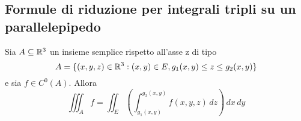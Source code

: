 \subsection{Formule di riduzione per integrali tripli su un parallelepipedo}
\begin{theorem}
  Sia $A\subseteq \mathbb{R}^3$ un insieme semplice rispetto all'asse z di tipo 
  $$A=\{(x,y,z)\in\mathbb{R}^3: (x,y)\in E, g_1(x,y)\leq z \leq g_2(x,y)\}$$
  e sia $f\in C^0(A)$. Allora 
  $$\iiint_{A}f = \iint_{E} \left(\int_{g_1(x,y)}^{g_2(x,y)} f(x,y,z) \,dz\right) \,dx\,dy$$
\end{theorem}